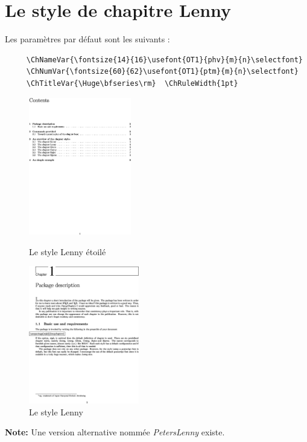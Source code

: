 \documentclass{report}
\begin{document}
    \section{Le style de chapitre Lenny}
    Les paramètres par défaut sont les suivants :
    {\small\begin{verbatim}
     \ChNameVar{\fontsize{14}{16}\usefont{OT1}{phv}{m}{n}\selectfont}
     \ChNumVar{\fontsize{60}{62}\usefont{OT1}{ptm}{m}{n}\selectfont}
     \ChTitleVar{\Huge\bfseries\rm}  \ChRuleWidth{1pt}
    \end{verbatim}}
    \begin{figure}[h]
      \begin{minipage}{7 cm}
        \centerline{\includegraphics[height=6cm]{Lennys.eps}} 
        \caption{Le style Lenny \og étoilé \fg{}}
      \end{minipage}\hfill
      \begin{minipage}{7 cm}
        \centerline{\includegraphics[height=6cm]{Lenny.eps}}
        \caption{Le style Lenny}
      \end{minipage}\hfill
    \end{figure}
    \textbf{Note:} Une version alternative nommée \textsl{PetersLenny} existe.
\end{document}

